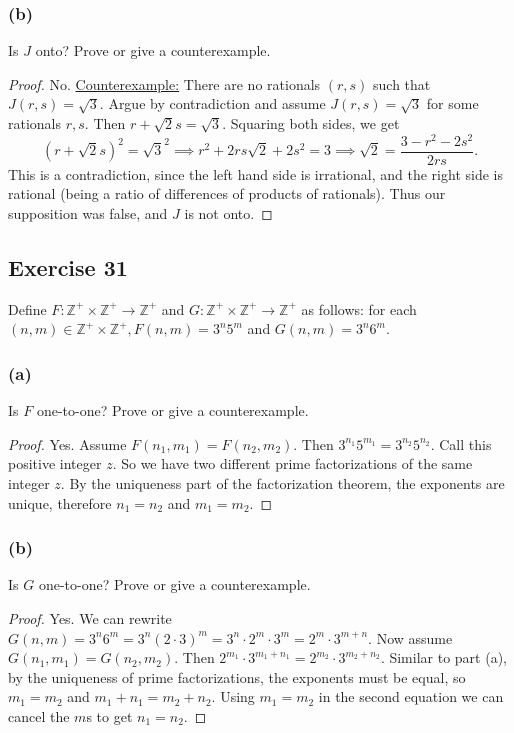 \documentclass[14pt]{extarticle}
\newcommand{\Z}{\mathbb{Z}}
\begin{document}
\subsubsection{(b)}
Is $J$ onto? Prove or give a counterexample.

\begin{proof}
No. \underline{Counterexample:} There are no rationals $(r, s)$ such that \(J(r,s) = \sqrt{3}\). Argue by contradiction
and assume \(J(r,s) = \sqrt{3}\) for some rationals $r,s$. Then \(r + \sqrt{2}s = \sqrt{3}\). Squaring both sides, we
get 
\[
(r + \sqrt{2}s)^2 = \sqrt{3}^2 \implies r^2 + 2rs\sqrt{2} + 2s^2 = 3 \implies \sqrt{2} = \frac{3 - r^2 - 2s^2}{2rs}.
\]
This is a contradiction, since the left hand side is irrational, and the right side is rational (being a ratio 
of differences of products of rationals). Thus our supposition was false, and $J$ is not onto.
\end{proof}

\subsection{Exercise 31}
Define \(F: \Z^+ \times \Z^+ \to \Z^+\) and \(G: \Z^+ \times \Z^+ \to \Z^+\) as follows: for each \((n, m) \in 
\Z^+ \times \Z^+, F(n, m) = 3^n5^m\) and \(G(n, m) = 3^n6^m\).

\subsubsection{(a)}
Is $F$ one-to-one? Prove or give a counterexample.

\begin{proof}
Yes. Assume \(F(n_1, m_1) = F(n_2, m_2)\). Then \(3^{n_1}5^{m_1} = 3^{n_2}5^{n_2}\). Call this positive integer $z$.
So we have two different prime factorizations of the same integer $z$. By the uniqueness part of the factorization
theorem, the exponents are unique, therefore \(n_1 = n_2\) and \(m_1 = m_2\).
\end{proof}

\subsubsection{(b)}
Is $G$ one-to-one? Prove or give a counterexample.

\begin{proof}
Yes. We can rewrite \(G(n, m) = 3^n6^m = 3^n (2 \cdot 3)^m = 3^n \cdot 2^m \cdot 3^m = 2^m \cdot 3^{m+n}\). Now 
assume \(G(n_1, m_1) = G(n_2, m_2)\). Then \(2^{m_1} \cdot 3^{m_1+n_1} = 2^{m_2} \cdot 3^{m_2+n_2}\). Similar to part
(a), by the uniqueness of prime factorizations, the exponents must be equal, so \(m_1 = m_2\) and 
\(m_1 + n_1 = m_2 + n_2\). Using \(m_1 = m_2\) in the second equation we can cancel the $m$s to get \(n_1=n_2\).
\end{proof}
\end{document}
